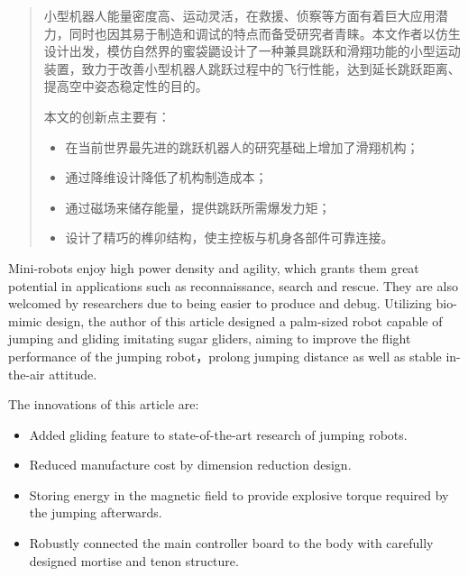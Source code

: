 

\begin{abstract}
  小型机器人能量密度高、运动灵活，在救援、侦察等方面有着巨大应用潜力，同时也因其易于制造和调试的特点而备受研究者青睐。本文作者以仿生设计出发，模仿自然界的蜜袋鼯设计了一种兼具跳跃和滑翔功能的小型运动装置，致力于改善小型机器人跳跃过程中的飞行性能，达到延长跳跃距离、提高空中姿态稳定性的目的。

  本文的创新点主要有：
  \begin{itemize}
    \item 在当前世界最先进的跳跃机器人的研究基础上增加了滑翔机构；
    \item 通过降维设计降低了机构制造成本；
    \item 通过磁场来储存能量，提供跳跃所需爆发力矩；
    \item 设计了精巧的榫卯结构，使主控板与机身各部件可靠连接。
  \end{itemize}

\end{abstract}

\begin{abstract*}
  Mini-robots enjoy high power density and agility, which grants them great potential in applications such as reconnaissance, search and rescue. They are also welcomed by researchers due to being easier to produce and debug. Utilizing bio-mimic design, the author of this article designed a palm-sized robot capable of jumping and gliding imitating sugar gliders, aiming to improve the flight performance of the jumping robot，prolong jumping distance as well as stable in-the-air attitude.

  The innovations of this article are:
  \begin{itemize}
    \item Added gliding feature to state-of-the-art research of jumping robots.
    \item Reduced manufacture cost by dimension reduction design.
    \item Storing energy in the magnetic field to provide explosive torque required by the jumping afterwards.
    \item Robustly connected the main controller board to the body with carefully designed mortise and tenon structure.
  \end{itemize}
\end{abstract*}
